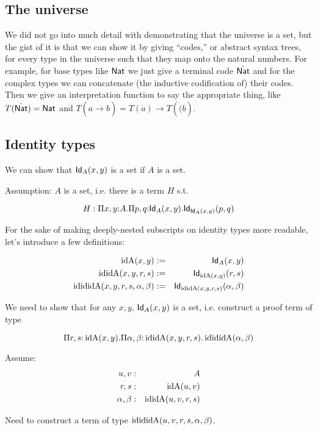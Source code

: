 \documentclass[11pt]{article}
\begin{document}
\subsection*{The universe}

We did not go into much detail with demonstrating that the universe is a
set, but the gist of it is that we can show it by giving ``codes,'' or abstract
syntax trees, for every type in the universe such that they map onto
the natural numbers. For example, for base types like $\mathsf{Nat}$ we just give a
terminal code $\dot{\mathsf{Nat}}$ and for the complex types we can concatenate
(the inductive codification of) their codes. Then we give an interpretation
function to say the appropriate thing, like $T(\dot{\mathsf{Nat}}) = \mathsf{Nat}$ and
$T(a\dot{\to}b) = T(\dot{a}) \to T(\dot(b)$.

\subsection*{Identity types}

We can show that $\mathsf{Id}_{A}(x,y)$ is a set if $A$ is a set.

Assumption: $A$ is a set, i.e. there is a term $H$ s.t.

\[
H : \Pi{x,y}{:}A.\Pi{p,q}{:}\mathsf{Id}_{A}(x,y).\mathsf{Id}_{\mathsf{Id}_{A}(x,y)}(p,q)
\]

For the sake of making deeply-nested subscripts on identity types more
readable, let's introduce a few definitions:

\newcommand{\idA}{\op{idA}}
\newcommand{\ididA}{\op{ididA}}
\newcommand{\idididA}{\op{idididA}}
\begin{eqnarray*}
\op{idA}(x,y) &:=& \Id{A}(x,y)\\
\op{ididA}(x,y,r,s) &:=& \Id{\idA(x,y)}(r,s) \\
\op{idididA}(x,y,r,s,\alpha,\beta) &:=& \Id{\ididA(x,y,r,s)}(\alpha,\beta)
\end{eqnarray*}

We need to show that for any $x,y$, 
$\mathsf{Id}_{A}(x,y)$ is a set, i.e. construct a proof term of type

\[
\Pi{r,s}{:}\idA(x,y).\Pi{\alpha,\beta}{:}\ididA(x,y,r,s).
\idididA(\alpha,\beta)
\]

Assume:
\begin{eqnarray*}
u,v &:& A\\
r,s &:& \idA(u,v)\\
\alpha,\beta &:& \ididA(u,v,r,s)
\end{eqnarray*}

Need to construct a term of type $\idididA(u,v,r,s,\alpha,\beta)$.
\end{document}
